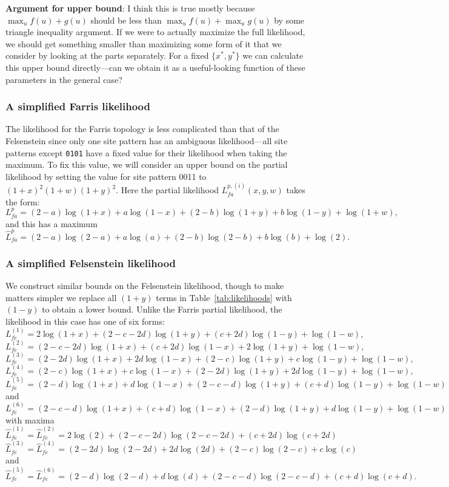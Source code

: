 \documentclass[a4paper]{article}
\begin{document}
\textbf{Argument for upper bound}: I think this is true mostly because $\max_u f(u) + g(u)$ should be less than $\max_u f(u) + \max_u g(u)$ by some triangle inequality argument.
If we were to actually maximize the full likelihood, we should get something smaller than maximizing some form of it that we consider by looking at the parts separately.
For a fixed $\{x^*, y^*\}$ we can calculate this upper bound directly---can we obtain it as a useful-looking function of these parameters in the general case?

\subsubsection{A simplified Farris likelihood}

The likelihood for the Farris topology is less complicated than that of the Felsenstein since only one site pattern has an ambiguous likelihood---all site patterns except \texttt{0101} have a fixed value for their likelihood when taking the maximum.
To fix this value, we will consider an upper bound on the partial likelihood by setting the value for site pattern 0011 to $(1+x)^2(1+w)(1+y)^2$.
Here the partial likelihood $L_{fa}^{p,(i)}(x,y,w)$ takes the form:
$$
L_{fa}^{p} = (2-a)\log(1+x)+a\log(1-x)+(2-b)\log(1+y)+b\log(1-y)+\log(1+w),
$$
and this has a maximum
$$
\hat{L}_{fa}^{p} = (2-a)\log(2-a)+a\log(a)+(2-b)\log(2-b)+b\log(b)+\log(2).
$$

\subsubsection{A simplified Felsenstein likelihood}

We construct similar bounds on the Felsenstein likelihood, though to make matters simpler we replace all $(1+y)$ terms in Table~\ref{tab:likelihoods} with $(1-y)$ to obtain a lower bound.
Unlike the Farris partial likelihood, the likelihood in this case has one of six forms:
$$
L_{fe}^{(1)} = 2\log(1+x)+(2-c-2d)\log(1+y)+(c+2d)\log(1-y)+\log(1-w),
$$
$$
L_{fe}^{(2)} = (2-c-2d)\log(1+x)+(c+2d)\log(1-x)+2\log(1+y)+\log(1-w),
$$
$$
L_{fe}^{(3)} = (2-2d)\log(1+x)+2d\log(1-x)+(2-c)\log(1+y)+c\log(1-y)+\log(1-w),
$$
$$
L_{fe}^{(4)} = (2-c)\log(1+x)+c\log(1-x)+(2-2d)\log(1+y)+2d\log(1-y)+\log(1-w),
$$
$$
L_{fe}^{(5)} = (2-d)\log(1+x)+d\log(1-x)+(2-c-d)\log(1+y)+(c+d)\log(1-y)+\log(1-w)
$$
and
$$
L_{fe}^{(6)} = (2-c-d)\log(1+x)+(c+d)\log(1-x)+(2-d)\log(1+y)+d\log(1-y)+\log(1-w)
$$
with maxima
$$
\hat{L}_{fe}^{(1)} = \hat{L}_{fe}^{(2)} = 2\log(2)+(2-c-2d)\log(2-c-2d)+(c+2d)\log(c+2d)
$$
$$
\hat{L}_{fe}^{(3)} = \hat{L}_{fe}^{(4)} = (2-2d)\log(2-2d)+2d\log(2d)+(2-c)\log(2-c)+c\log(c)
$$
and
$$
\hat{L}_{fe}^{(5)} = \hat{L}_{fe}^{(6)} = (2-d)\log(2-d)+d\log(d)+(2-c-d)\log(2-c-d)+(c+d)\log(c+d).
$$
\end{document}
